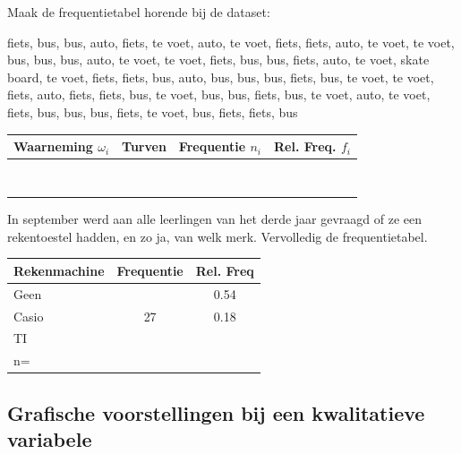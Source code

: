 \documentclass[12pt,twoside]{article}
\begin{document}
\begin{oefening}
Maak de frequentietabel horende bij de dataset:
\begin{center}
fiets, bus, bus, auto, fiets, te voet, auto, te voet, fiets, fiets, auto, te voet, te voet, bus, bus, bus, auto, te voet, te voet, fiets, bus, bus, fiets, auto, te voet, skate board, te voet, fiets, fiets, bus, auto, bus, bus, bus, fiets, bus, te voet, te voet, fiets, auto, fiets, fiets, bus, te voet, bus, bus, fiets, bus, te voet, auto, te voet, fiets, bus, bus, bus, fiets, te voet, bus, fiets, fiets, bus 
\end{center}
\begin{center}
  \begin{tabular}{p{4cm}|p{3cm}|p{2.5cm}|p{2.5cm}}
    Waarneming $\omega_i$ & Turven & Frequentie $n_i$ & Rel. Freq. $f_i$\\
    \hline
    &&\\
    \hline
    &&\\
    \hline
    &&\\
    \hline
    &&\\
    \hline
    &&\\
    \hline
    &&\\
    \hline
    &&\\
    \hline
    &&\\
  \end{tabular}
\end{center}
\end{oefening}


\begin{oefening}
In september werd aan alle leerlingen van het derde jaar gevraagd of ze een rekentoestel hadden, en zo ja, van welk merk. Vervolledig de frequentietabel.
\begin{center}
\begin{tabular}{l|c|c}
Rekenmachine & Frequentie & Rel. Freq\\\hline
Geen & & 0.54\\\hline
Casio & 27 & 0.18\\\hline
TI & &\\\hline
n= & &\\
\end{tabular}
\end{center}
\end{oefening}

\pagebreak
\subsection{Grafische voorstellingen bij een kwalitatieve variabele}
\end{document}
